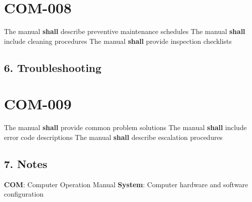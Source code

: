 \section{COM-008}\label{COM-008}

The manual \textbf{shall} describe preventive maintenance schedules
The manual \textbf{shall} include cleaning procedures
The manual \textbf{shall} provide inspection checklists

\subsection{6. Troubleshooting}

\section{COM-009}\label{COM-009}

The manual \textbf{shall} provide common problem solutions
The manual \textbf{shall} include error code descriptions
The manual \textbf{shall} describe escalation procedures

\subsection{7. Notes}
\textbf{COM}: Computer Operation Manual
\textbf{System}: Computer hardware and software configuration

